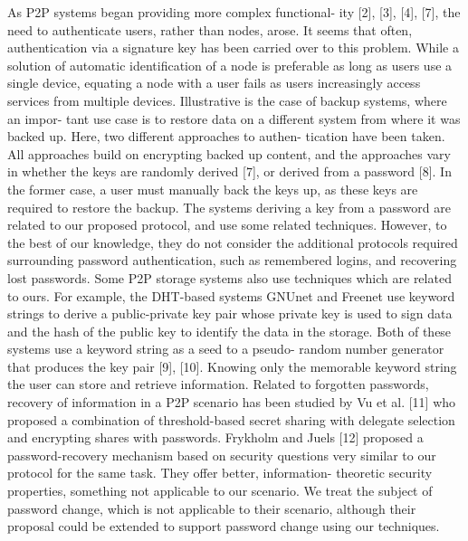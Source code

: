 As P2P systems began providing more complex functional-
ity [2], [3], [4], [7], the need to authenticate users, rather than
nodes, arose. It seems that often, authentication via a signature
key has been carried over to this problem. While a solution
of automatic identification of a node is preferable as long as
users use a single device, equating a node with a user fails as
users increasingly access services from multiple devices.
Illustrative is the case of backup systems, where an impor-
tant use case is to restore data on a different system from where
it was backed up. Here, two different approaches to authen-
tication have been taken. All approaches build on encrypting
backed up content, and the approaches vary in whether the
keys are randomly derived [7], or derived from a password [8].
In the former case, a user must manually back the keys up,
as these keys are required to restore the backup. The systems
deriving a key from a password are related to our proposed
protocol, and use some related techniques. However, to the
best of our knowledge, they do not consider the additional
protocols required surrounding password authentication, such
as remembered logins, and recovering lost passwords.
Some P2P storage systems also use techniques which are
related to ours. For example, the DHT-based systems GNUnet
and Freenet use keyword strings to derive a public-private key
pair whose private key is used to sign data and the hash of
the public key to identify the data in the storage. Both of
these systems use a keyword string as a seed to a pseudo-
random number generator that produces the key pair [9], [10].
Knowing only the memorable keyword string the user can
store and retrieve information.
Related to forgotten passwords, recovery of information in a
P2P scenario has been studied by Vu et al. [11] who proposed
a combination of threshold-based secret sharing with delegate
selection and encrypting shares with passwords.
Frykholm and Juels [12] proposed a password-recovery
mechanism based on security questions very similar to our
protocol for the same task. They offer better, information-
theoretic security properties, something not applicable to our
scenario. We treat the subject of password change, which is not applicable to
their scenario, although their proposal could be extended to support password
change using our techniques.
